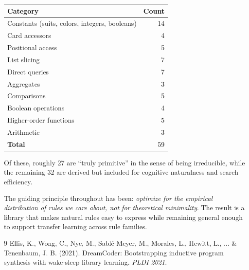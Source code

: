 \documentclass[11pt]{article}
\begin{document}
\begin{center}
\begin{tabular}{lr}
\toprule
\textbf{Category} & \textbf{Count} \\
\midrule
Constants (suits, colors, integers, booleans) & 14 \\
Card accessors & 4 \\
Positional access & 5 \\
List slicing & 7 \\
Direct queries & 7 \\
Aggregates & 3 \\
Comparisons & 5 \\
Boolean operations & 4 \\
Higher-order functions & 5 \\
Arithmetic & 3 \\
\midrule
\textbf{Total} & 59 \\
\bottomrule
\end{tabular}
\end{center}

Of these, roughly 27 are ``truly primitive'' in the sense of being irreducible, while the remaining 32 are derived but included for cognitive naturalness and search efficiency.

The guiding principle throughout has been: \emph{optimize for the empirical distribution of rules we care about, not for theoretical minimality}. The result is a library that makes natural rules easy to express while remaining general enough to support transfer learning across rule families.

\begin{thebibliography}{9}
Ellis, K., Wong, C., Nye, M., Sablé-Meyer, M., Morales, L., Hewitt, L., ... \& Tenenbaum, J. B. (2021). DreamCoder: Bootstrapping inductive program synthesis with wake-sleep library learning. \textit{PLDI 2021}.
\end{thebibliography}
\end{document}
